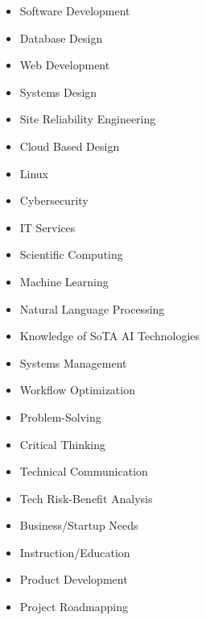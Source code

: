 
\begin{multicols}{3}
    \begin{itemize}
        \item Software Development
        \item Database Design
        \item Web Development
        \item Systems Design
        \item Site Reliability Engineering
        \item Cloud Based Design
        \item Linux
        \item Cybersecurity
        \item IT Services
        \item Scientific Computing
        \item Machine Learning
        \item Natural Language Processing
        \item Knowledge of SoTA AI Technologies
        \item Systems Management
        \item Workflow Optimization
        \item Problem-Solving
        \item Critical Thinking
        \item Technical Communication
        \item Tech Risk-Benefit Analysis
        \item Business/Startup Needs
        \item Instruction/Education
        \item Product Development
        \item Project Roadmapping
    \end{itemize}
\end{multicols}

